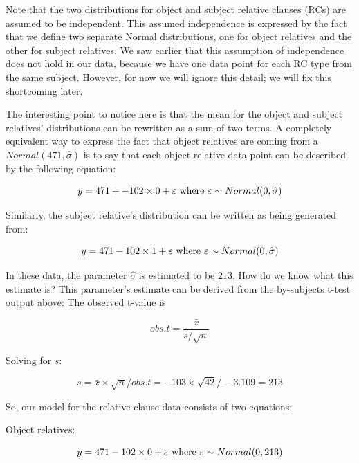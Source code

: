 \documentclass[12pt,]{krantz}
\begin{document}
Note that the two distributions for object and subject relative clauses (RCs) are assumed to be independent. This assumed independence is expressed by the fact that we define two separate Normal distributions, one for object relatives and the other for subject relatives. We saw earlier that this assumption of independence does not hold in our data, because we have one data point for each RC type from the same subject. However, for now we will ignore this detail; we will fix this shortcoming later.

The interesting point to notice here is that the mean for the object and subject relatives' distributions can be rewritten as a sum of two terms. A completely equivalent way to express the fact that object relatives are coming from a \(Normal(471,\hat\sigma)\) is to say that each object relative data-point can be described by the following equation:

\begin{equation}
y = 471 + -102 \times 0 + \varepsilon \hfill \hbox{ where } \varepsilon \sim Normal(0,\hat\sigma)
\end{equation}

Similarly, the subject relative's distribution can be written as being generated from:

\begin{equation}
y = 471 - 102 \times 1 + \varepsilon \hbox{ where } \varepsilon \sim Normal(0,\hat\sigma)
\end{equation}

In these data, the parameter \(\hat\sigma\) is estimated to be \(213\). How do we know what this estimate is? This parameter's estimate can be derived from the by-subjects t-test output above: The observed t-value is

\begin{equation}
obs.t= \frac{\bar{x}}{s/\sqrt{n}} 
\end{equation}

Solving for \(s\):

\begin{equation}
 s = \bar{x} \times \sqrt{n}/obs.t = -103 \times \sqrt{42}/-3.109  =  213
\end{equation}

So, our model for the relative clause data consists of two equations:

Object relatives:

\begin{equation}
y = 471 -102\times 0 + \varepsilon \hfill \hbox{ where } \varepsilon \sim Normal(0,213)
\end{equation}
\end{document}
